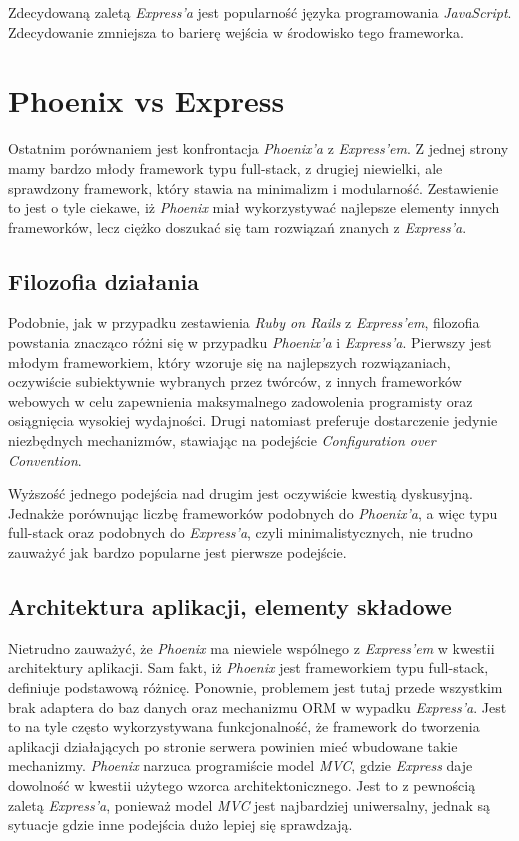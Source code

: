 Zdecydowaną zaletą \textit{Express'a} jest popularność języka programowania \textit{JavaScript}. Zdecydowanie zmniejsza to barierę wejścia w środowisko tego frameworka.

\section{Phoenix vs Express}
Ostatnim porównaniem jest konfrontacja \textit{Phoenix'a} z \textit{Express'em}. Z jednej strony mamy bardzo młody framework typu full-stack, z drugiej niewielki, ale sprawdzony framework, który stawia na minimalizm i modularność. Zestawienie to jest o tyle ciekawe, iż \textit{Phoenix} miał wykorzystywać najlepsze elementy innych frameworków, lecz ciężko doszukać się tam rozwiązań znanych z \textit{Express'a}.

\subsection{Filozofia działania}
Podobnie, jak w przypadku zestawienia \textit{Ruby on Rails} z \textit{Express'em}, filozofia powstania znacząco różni się w przypadku \textit{Phoenix'a} i \textit{Express'a}. Pierwszy jest młodym frameworkiem, który wzoruje się na najlepszych rozwiązaniach, oczywiście subiektywnie wybranych przez twórców, z innych frameworków webowych w celu zapewnienia maksymalnego zadowolenia programisty oraz osiągnięcia wysokiej wydajności. Drugi natomiast preferuje dostarczenie jedynie niezbędnych mechanizmów, stawiając na podejście \emph{Configuration over Convention}.

Wyższość jednego podejścia nad drugim jest oczywiście kwestią dyskusyjną. Jednakże porównując liczbę frameworków podobnych do \emph{Phoenix'a}, a więc typu full-stack oraz podobnych do \emph{Express'a}, czyli minimalistycznych, nie trudno zauważyć jak bardzo popularne jest pierwsze podejście.

\subsection{Architektura aplikacji, elementy składowe}
Nietrudno zauważyć, że \emph{Phoenix} ma niewiele wspólnego z \emph{Express'em} w kwestii architektury aplikacji. Sam fakt, iż \emph{Phoenix} jest frameworkiem typu full-stack, definiuje podstawową różnicę. Ponownie, problemem jest tutaj przede wszystkim brak adaptera do baz danych oraz mechanizmu ORM w wypadku \emph{Express'a}. Jest to na tyle często wykorzystywana funkcjonalność, że framework do tworzenia aplikacji działających po stronie serwera powinien mieć wbudowane takie mechanizmy. \emph{Phoenix} narzuca programiście model \emph{MVC}, gdzie \emph{Express} daje dowolność w kwestii użytego wzorca architektonicznego. Jest to z pewnością zaletą \emph{Express'a}, ponieważ model \emph{MVC} jest najbardziej uniwersalny, jednak są sytuacje gdzie inne podejścia dużo lepiej się sprawdzają.

